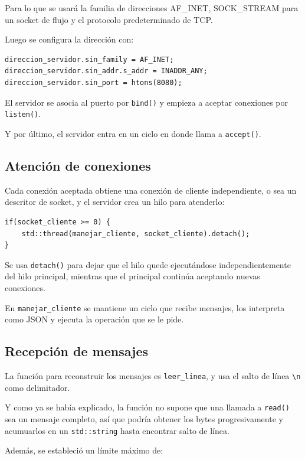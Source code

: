 \documentclass[12pt,letterpaper]{article}
\begin{document}
Para lo que se usará la familia de direcciones
AF\_INET, SOCK\_STREAM para un socket de flujo y el protocolo predeterminado de TCP.

Luego se configura la dirección con:

\begin{lstlisting}[style=cppstyle]
direccion_servidor.sin_family = AF_INET;
direccion_servidor.sin_addr.s_addr = INADDR_ANY;
direccion_servidor.sin_port = htons(8080);
\end{lstlisting}

El servidor se asocia al puerto por \texttt{bind()} y empieza a
aceptar conexiones por \texttt{listen()}.

Y por último, el servidor entra en un ciclo en donde llama a \texttt{accept()}.

\subsection{Atención de conexiones}

Cada conexión aceptada obtiene una conexión de cliente independiente, o sea un descritor de socket, y el servidor crea un hilo para atenderlo:

\begin{lstlisting}[style=cppstyle]
if(socket_cliente >= 0) {
    std::thread(manejar_cliente, socket_cliente).detach();
}
\end{lstlisting}

Se usa \texttt{detach()} para dejar que el hilo quede ejecutándose independientemente del hilo principal, mientras que el principal continúa
aceptando nuevas conexiones.

En \texttt{manejar\_cliente} se mantiene un ciclo que recibe mensajes,
los interpreta como JSON y ejecuta la operación que se le pide.

\subsection{Recepción de mensajes}

La función para reconstruir los mensajes es
\texttt{leer\_linea}, y usa el salto de línea \texttt{\textbackslash n} como delimitador.

Y como ya se había explicado, la función no supone que una llamada a \texttt{read()} sea un
mensaje completo, así que podría obtener los bytes progresivamente y acumuarlos en un \texttt{std::string} hasta encontrar salto de línea.

Además, se estableció un límite máximo de:
\end{document}
